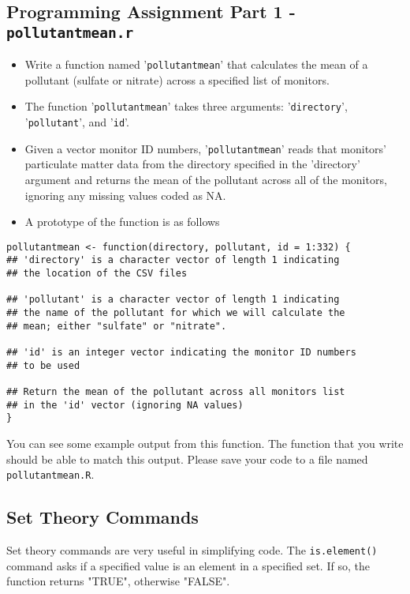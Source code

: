 \documentclass[]{article}
\begin{document}
\subsection{Programming Assignment Part 1  - \texttt{pollutantmean.r}}
\begin{itemize}
\item Write a function named '\texttt{pollutantmean}' that calculates the mean of a pollutant (sulfate or nitrate) across a specified list of monitors. 
\item The function '\texttt{pollutantmean}' takes three arguments: '\texttt{directory}', '\texttt{pollutant}', and '\texttt{id}'. 
\item Given a vector monitor ID numbers, '\texttt{pollutantmean}' reads that monitors' particulate matter data from the directory specified in the 'directory' argument and returns the mean of the pollutant across all of the monitors, ignoring any missing values coded as NA. 
\item A prototype of the function is as follows
\end{itemize}


\begin{framed}
\begin{verbatim}
pollutantmean <- function(directory, pollutant, id = 1:332) {
## 'directory' is a character vector of length 1 indicating
## the location of the CSV files

## 'pollutant' is a character vector of length 1 indicating
## the name of the pollutant for which we will calculate the
## mean; either "sulfate" or "nitrate".

## 'id' is an integer vector indicating the monitor ID numbers
## to be used

## Return the mean of the pollutant across all monitors list
## in the 'id' vector (ignoring NA values)
}
\end{verbatim}
\end{framed}
You can see some example output from this function. The function that you write should be able to match this output. Please save your code to a file named \texttt{pollutantmean.R}.

\newpage


\subsection{Set Theory Commands}
Set theory commands are very useful in simplifying code. The \texttt{is.element()} command asks if a specified value is an element in a specified set. If so, the function returns "TRUE", otherwise "FALSE".
\end{document}
